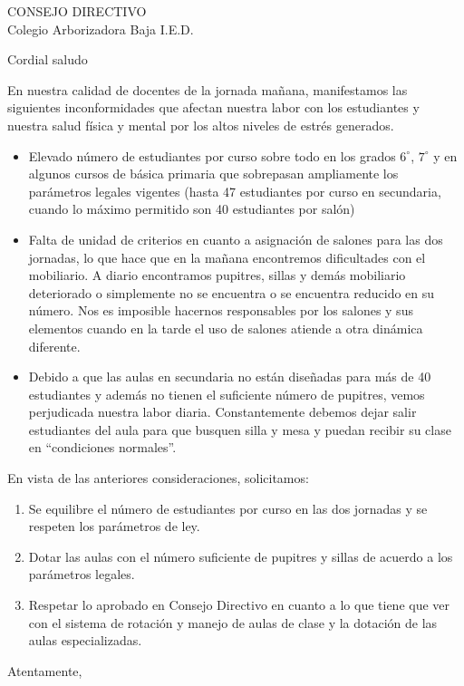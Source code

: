 \documentclass[spanish,11pt]{letter}
\date{26 de febrero de 2015}
\begin{document}
\begin{letter}{CONSEJO DIRECTIVO\\Colegio Arborizadora Baja I.E.D.}
	
\opening{Cordial saludo}
En nuestra calidad de docentes de la jornada mañana, manifestamos las siguientes inconformidades que afectan nuestra labor con los estudiantes y nuestra salud física y mental por los altos niveles de estr\'{e}s generados.
\begin{itemize}
\item Elevado n\'{u}mero de estudiantes por curso sobre todo en los grados $6^{\circ}$, $7^{\circ}$ y en algunos cursos de básica primaria que sobrepasan ampliamente los par\'{a}metros legales vigentes (hasta 47 estudiantes por curso en secundaria, cuando lo m\'{a}ximo permitido son 40 estudiantes por sal\'{o}n)
\item Falta de unidad de criterios en cuanto a asignación de salones para las dos jornadas, lo que hace que en la mañana encontremos dificultades con el mobiliario. A diario encontramos pupitres, sillas y demás mobiliario deteriorado o simplemente no se encuentra o se encuentra reducido en su número. Nos es imposible hacernos responsables por los salones y sus elementos cuando en la tarde el uso de salones atiende a otra dinámica diferente.
\item Debido a que las aulas en secundaria no están diseñadas para más de 40 estudiantes y además no tienen el suficiente número de pupitres, vemos perjudicada nuestra labor diaria. Constantemente debemos dejar salir estudiantes del aula para que busquen silla y mesa y puedan recibir su clase en ``condiciones normales''.
\end{itemize}
En vista de las anteriores consideraciones, solicitamos: 
\begin{enumerate}
\item Se equilibre el número de estudiantes por curso en las dos jornadas y se respeten los parámetros de ley.
\item Dotar las aulas con el número suficiente de pupitres y sillas de acuerdo a los parámetros legales.
\item Respetar lo aprobado en Consejo Directivo en cuanto a lo que tiene que ver con el sistema de rotación y manejo de aulas de clase y la dotación de las aulas especializadas.
\end{enumerate}

\closing{Atentamente,}


\end{letter}
\end{document}
